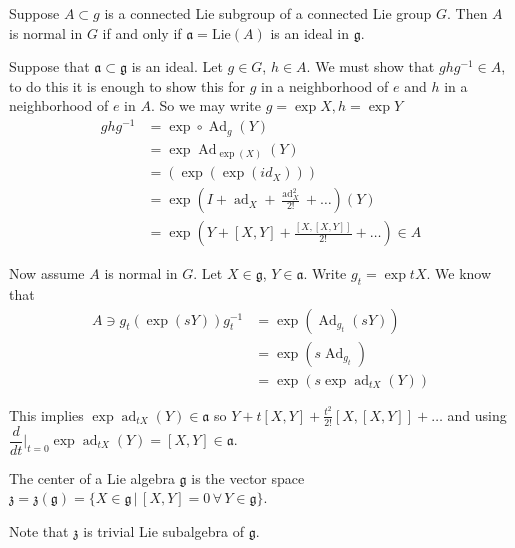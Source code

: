 \documentclass[11pt,a4paper]{scrarticle}
\theoremstyle{definition}
\renewenvironment{proof}[1][\proofname]{\vspace{-10pt}\begin{myproof}}{\end{myproof}}
\theoremstyle{greenbox}
\newcommand{\ag}{\mathfrak{a}}
\newcommand{\fg}{\mathfrak{g}}
\begin{document}
\begin{thm}
    Suppose $ A \subset g$ is a connected Lie subgroup of a connected Lie group $ G $. Then $ A $ is normal in $ G $ if and only if $ \ag = \text{Lie}(A) $ is an ideal in $ \fg $.
\end{thm}
\begin{proof}
    Suppose that $ \ag  \subset \fg $ is an ideal. Let $ g \in G $, $ h \in A $. We must show that $ ghg^{-1} \in A $, to do this it is enough to show this for $ g $ in a neighborhood of $ e $ and $ h $ in a neighborhood of $ e $ in $ A $. So we may write $ g = \exp X, h = \exp Y $  \begin{align*}
        ghg^{-1} & = \exp \circ \operatorname{Ad}_{g}(Y) \\
        & = \exp \operatorname{Ad}_{\exp(X)}(Y) \\
        & = \left( \exp \left( \exp(id_{X}) \right) \right) \\
        & = \exp \left( I + \operatorname{ad}_{X} + \frac{\operatorname{ad}_{X}^{2}}{2!} + \ldots \right)(Y) \\
        & = \exp\left(Y+ [X,Y]+ \frac{[X,[X,Y]]}{2!}+ \ldots \right) \in A
    \end{align*}

Now assume $ A $ is normal in $ G $. Let $ X \in \fg $, $ Y \in \ag $. Write $ g_{t} = \exp tX $. We know that \begin{align*}
   A \ni g_{t} ( \exp(sY))g_{t}^{-1} & = \exp( \operatorname{Ad}_{g_{t}}(sY)) \\
   & = \exp(s \operatorname{Ad}_{g_{t}}) \\
   & = \exp(s \exp \operatorname{ad}_{tX}(Y))
\end{align*}

This implies $ \exp \operatorname{ad}_{tX}(Y) \in \ag $ so $ Y+ t[X,Y] + \frac{t^{2}}{2!}[X,[X,Y]] + \dots $ and using \newline 
$ \dfrac{d}{dt}\bigg|_{t=0} \exp \operatorname{ad}_{tX}(Y) = [X,Y] \in \ag $.
\end{proof}

\begin{defn}
    The center of a Lie algebra $\fg $ is the vector space $ \mathfrak{z} = \mathfrak{z}(\fg) = \{X \in \fg \,  | \, [X,Y] = 0 \, \forall \, Y \in \fg\} $.
\end{defn}
\begin{remark}
    Note that $ \mathfrak{z} $ is trivial Lie subalgebra of $ \fg $.
\end{remark}
\end{document}
